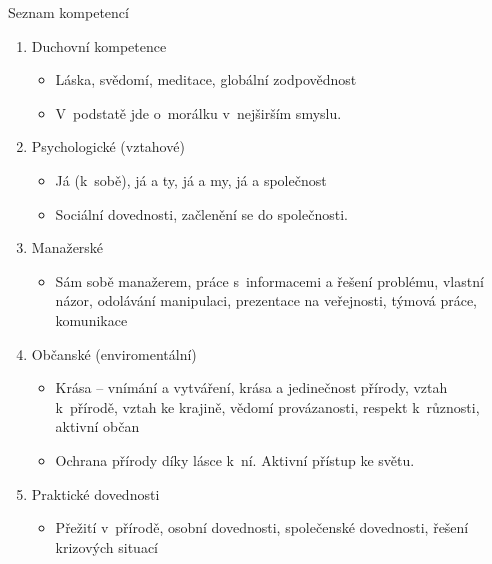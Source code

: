 \documentclass[compress,utf8,xcolor=dvipsnames]{beamer}
\begin{document}
\begin{frame}{Seznam kompetencí}
\begin{enumerate}
\item Duchovní kompetence
 \begin{itemize}
 \item Láska, svědomí, meditace, globální zodpovědnost
 \item V~podstatě jde o~morálku v~nejširším smyslu.
 \end{itemize}
\item Psychologické (vztahové)
 \begin{itemize}
 \item Já (k~sobě), já a ty, já a my, já a společnost
 \item Sociální dovednosti, začlenění se do společnosti.
 \end{itemize}
\item Manažerské
 \begin{itemize}
 \item Sám sobě manažerem, práce s~informacemi a řešení problému, vlastní názor, odolávání manipulaci, prezentace na veřejnosti, týmová práce, komunikace
 \end{itemize}
\item Občanské (enviromentální)
 \begin{itemize}
 \item Krása -- vnímání a vytváření, krása a jedinečnost přírody, vztah k~přírodě, vztah ke krajině, vědomí provázanosti, respekt k~různosti, aktivní občan
 \item Ochrana přírody díky lásce k~ní. Aktivní přístup ke světu.
 \end{itemize}
\item Praktické dovednosti
 \begin{itemize}
 \item Přežití v~přírodě, osobní dovednosti, společenské dovednosti, řešení krizových situací
 \end{itemize}
\end{enumerate}
\end{frame}
\end{document}
